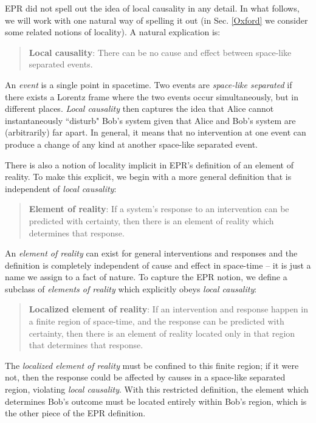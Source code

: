 \documentclass[12pt]{article}
\begin{document}
EPR did not spell out the idea of local causality in any detail. In what follows, we will work with one natural way of spelling it out (in Sec. \ref{Oxford} we consider some related notions of locality). A natural explication is:

\begin{quote}
\textbf{Local causality}: There can be no cause and effect between space-like separated events.
\end{quote}

An \textit{event} is a single point in spacetime. Two events are \textit{space-like separated} if there exists a Lorentz frame where the two events occur simultaneously, but in different places. \textit{Local causality} then captures the idea that Alice cannot instantaneously ``disturb" Bob's system given that Alice and Bob's system are (arbitrarily) far apart.  In general, it means that no intervention at one event can produce a change of any kind at another space-like separated event.

There is also a notion of locality implicit in EPR's definition of an element of reality. To make this explicit, we begin with a more general definition that is independent of \textit{local causality}:

\begin{quote}
\textbf{Element of reality}: If a system's response to an intervention can be predicted with certainty, then there is an element of reality which determines that response.
\end{quote}

An \textit{element of reality} can exist for general interventions and responses and the definition is completely independent of cause and effect in space-time -- it is just a name we assign to a fact of nature.  To capture the EPR notion, we define a subclass of \textit{elements of reality} which explicitly obeys \textit{local causality}:

\begin{quote}
\textbf{Localized element of reality}: If an intervention and response happen in a finite region of space-time, and the response can be predicted with certainty, then there is an element of reality located only in that region that determines that response.
\end{quote}

The \textit{localized element of reality} must be confined to this finite region; if it were not, then the response could be affected by causes in a space-like separated region, violating \textit{local causality}. With this restricted definition, the element which determines Bob's outcome must be located entirely within Bob's region, which is the other piece of the EPR definition. 
\end{document}
